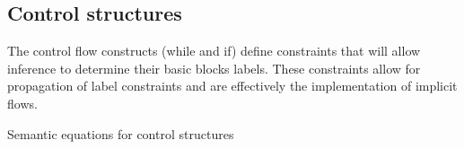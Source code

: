 \subsection{Control structures}
The control flow constructs (while and if) define constraints that will allow inference to determine their basic blocks labels.
These constraints allow for propagation of label constraints and are effectively the implementation of implicit flows.

\begin{table}[H]
\begin{semanticequations}
 \seSpace
 \seSpace
%
\end{semanticequations}
\caption{Semantic equations for control structures}
\label{cstr:controlstructures}
\end{table}

